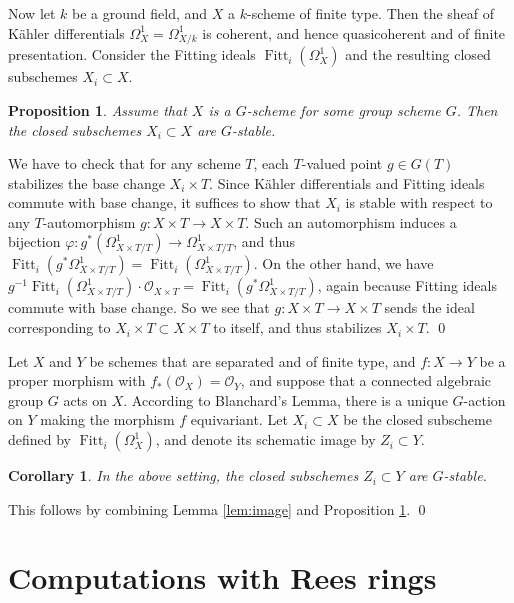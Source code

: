 \documentclass[oneside, 12pt]{amsart}
\newtheorem{proposition}[theorem]{Proposition}
\newtheorem{corollary}[theorem]{Corollary}
\theoremstyle{definition}
\theoremstyle{remark}
\newcommand{\Fitt}{\operatorname{Fitt}}
\renewcommand{\O}{\mathscr{O}}
\newcommand{\ra}{\rightarrow}
\begin{document}
Now let $k$ be a ground field, and $X$ a $k$-scheme 
of finite type. Then the sheaf of K\"ahler differentials 
$\Omega^1_X = \Omega^1_{X/k}$ 
is coherent, and hence quasicoherent and of finite presentation.
Consider the Fitting ideals $\Fitt_i(\Omega^1_X)$ and the resulting 
closed subschemes $X_i\subset X$.

\begin{proposition}
\label{prop:stable}
Assume that $X$ is a $G$-scheme for some group scheme $G$. 
Then the closed subschemes $X_i\subset X$ are $G$-stable.
\end{proposition}

\proof
We have to check that for any scheme $T$, each $T$-valued point 
$g\in G(T)$ 
stabilizes the base change $X_i \times T$.
Since K\"ahler differentials and Fitting ideals commute with 
base change, it suffices to show that
$X_i$ is stable with respect to any $T$-automorphism 
$g:X \times T \ra X \times T$.
Such an automorphism induces a bijection 
$\varphi:g^*(\Omega^1_{X \times T/T})\ra \Omega^1_{X \times T/T}$,
and thus 
$\Fitt_i(g^*\Omega^1_{X \times T/T}) =  \Fitt_i(\Omega^1_{X \times T/T})$.
On the other hand, we have 
$g^{-1}\Fitt_i(\Omega^1_{X \times T/T}) \cdot \O_{X \times T} 
= \Fitt_i(g^*\Omega^1_{X \times T/T})$,
again because Fitting ideals commute with base change. 
So we see that $g :X \times T \ra X \times T$ 
sends the ideal corresponding to $X_i \times T\subset X \times T$ 
to itself, and thus stabilizes $X_i \times T$.
\qed

\medskip

Let $X$ and $Y$ be schemes that are separated and of finite type, 
and $f:X\ra Y$ be a proper morphism with $f_*(\O_X)=\O_Y$,
and suppose that a connected algebraic group $G$  acts on $X$. 
According to Blanchard's Lemma, there is a unique $G$-action on $Y$ 
making the morphism $f$ equivariant.
Let  $X_i\subset X$ be the closed subscheme defined by 
$\Fitt_i(\Omega^1_X)$,
and denote its schematic image by $Z_i \subset Y$. 

\begin{corollary}
\label{cor:stable}
In the above setting, the closed subschemes 
$Z_i \subset Y$ are $G$-stable.
\end{corollary}

\proof
This follows by combining Lemma \ref{lem:image} and 
Proposition \ref{prop:stable}.
\qed
 
 

\section{Computations with Rees rings}
\label{sec:rees}
\end{document}
